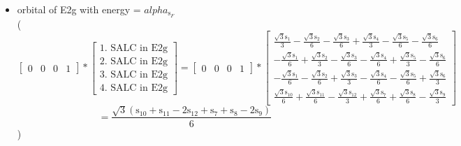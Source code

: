 \documentclass[12pt,a4paper]{article}
\begin{document}
\begin{itemize}
\textcolor{red}{Error in Orthogonalization of SALCs}\textcolor{red}{Error in Orthogonalization of SALCs}\textcolor{red}{Error in Orthogonalization of SALCs}\item orbital of E2g with energy = 
                                $alpha_{\text{s}_F}$ \\
( 
$$
\left[\begin{matrix}0 & 0 & 0 & 1\end{matrix}\right] * \left[\begin{array}{c}\text{1. SALC in E2g} \\ \text{2. SALC in E2g} \\ \text{3. SALC in E2g} \\ \text{4. SALC in E2g}\end{array}\right] = \left[\begin{matrix}0 & 0 & 0 & 1\end{matrix}\right] * \left[\begin{matrix}\frac{\sqrt{3} \text{s}_{1}}{3} - \frac{\sqrt{3} \text{s}_{2}}{6} - \frac{\sqrt{3} \text{s}_{3}}{6} + \frac{\sqrt{3} \text{s}_{4}}{3} - \frac{\sqrt{3} \text{s}_{5}}{6} - \frac{\sqrt{3} \text{s}_{6}}{6}\\- \frac{\sqrt{3} \text{s}_{1}}{6} + \frac{\sqrt{3} \text{s}_{2}}{3} - \frac{\sqrt{3} \text{s}_{3}}{6} - \frac{\sqrt{3} \text{s}_{4}}{6} + \frac{\sqrt{3} \text{s}_{5}}{3} - \frac{\sqrt{3} \text{s}_{6}}{6}\\- \frac{\sqrt{3} \text{s}_{1}}{6} - \frac{\sqrt{3} \text{s}_{2}}{6} + \frac{\sqrt{3} \text{s}_{3}}{3} - \frac{\sqrt{3} \text{s}_{4}}{6} - \frac{\sqrt{3} \text{s}_{5}}{6} + \frac{\sqrt{3} \text{s}_{6}}{3}\\\frac{\sqrt{3} \text{s}_{10}}{6} + \frac{\sqrt{3} \text{s}_{11}}{6} - \frac{\sqrt{3} \text{s}_{12}}{3} + \frac{\sqrt{3} \text{s}_{7}}{6} + \frac{\sqrt{3} \text{s}_{8}}{6} - \frac{\sqrt{3} \text{s}_{9}}{3}\end{matrix}\right] 
 $$ $$ = \frac{\sqrt{3} \left(\text{s}_{10} + \text{s}_{11} - 2 \text{s}_{12} + \text{s}_{7} + \text{s}_{8} - 2 \text{s}_{9}\right)}{6} 
 $$ 
 )


\end{itemize}
\end{document}
